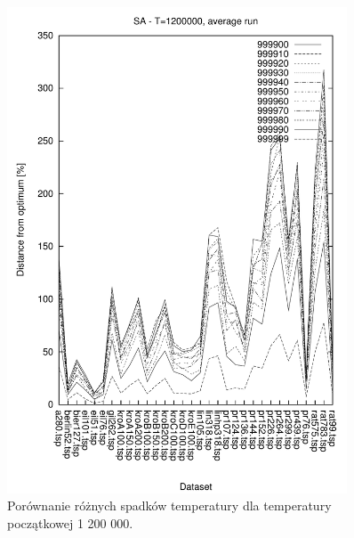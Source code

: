 \begin{figure}
\begin{center}
\includegraphics[width=0.9\textwidth]{wykresy/sa/sa_1200000_av}
\end{center}
\caption{Porównanie różnych spadków temperatury dla temperatury początkowej 1 200 000.}
\label{sa_1200000_av}
\end{figure}


